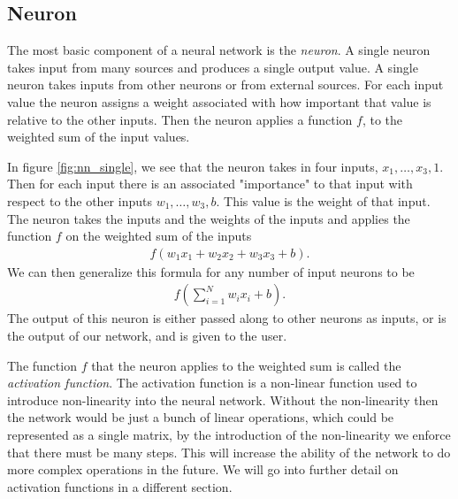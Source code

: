 \documentclass[10pt]{amsart}
\newenvironment{Figure}
{\par\medskip\noindent\minipage{\linewidth}}
{\endminipage\par\medskip}
\begin{document}
\begin{multicols}{2}
  \subsection{Neuron}%
  \label{sub:neuron}

  The most basic component of a neural network is the \textit{neuron}. A single
  neuron takes input from many sources and produces a single output value. A
  single neuron takes inputs from other neurons or from external sources. For
  each input value the neuron assigns a weight associated with how important
  that value is relative to the other inputs. Then the neuron applies a
  function $f$, to the weighted sum of the input values.

  \begin{Figure}
    \begin{center}
      
    \end{center}
    \label{fig:nn_single}
  \end{Figure}

  In figure \ref{fig:nn_single}, we see that the neuron takes in four inputs,
  $x_1,\ldots,x_3,1$. Then for each input there is an associated "importance"
  to that input with respect to the other inputs $w_1,\ldots,w_3,b$. This value
  is the weight of that input. The neuron takes the inputs and the weights of
  the inputs and applies the function $f$ on the weighted sum of the inputs
  \begin{align*}
    f(w_1x_1+w_2x_2+w_3x_3+b).
  \end{align*}
  We can then generalize this formula for any number of input neurons to be
  \begin{align}\label{eq:nn_neuron}
    f\left(\sum_{i=1}^Nw_ix_i+b\right).
  \end{align}
  The output of this neuron is either passed along to other neurons as inputs,
  or is the output of our network, and is given to the user.

  The function $f$ that the neuron applies to the weighted sum is called the
  \textit{activation function}. The activation function is a non-linear
  function used to introduce non-linearity into the neural network. Without the
  non-linearity then the network would be just a bunch of linear operations,
  which could be represented as a single matrix, by the introduction of the
  non-linearity we enforce that there must be many steps. This will increase
  the ability of the network to do more complex operations in the future. We
  will go into further detail on activation functions in a different section.


\end{multicols}
\end{document}

